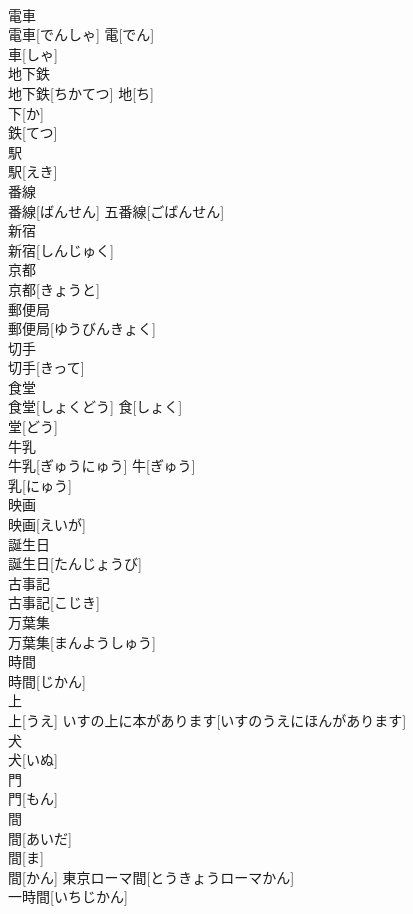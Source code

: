\documentclass[8pt]{extreport}
\begin{document}
\begin{CJK}{UTF8}{min}
\\	電車	
\\	電車[でんしゃ]	電[でん] 
\\	車[しゃ] 
\\	地下鉄	
\\	地下鉄[ちかてつ]	地[ち] 
\\	下[か] 
\\	鉄[てつ] 
\\	駅	
\\	駅[えき]	
\\	番線	
\\	番線[ばんせん]	五番線[ごばんせん] 
\\	新宿	
\\	新宿[しんじゅく]	
\\	京都	
\\	京都[きょうと]	
\\	郵便局	
\\	郵便局[ゆうびんきょく]	
\\	切手	
\\	切手[きって]	
\\	食堂	
\\	食堂[しょくどう]	食[しょく] 
\\	堂[どう] 
\\	牛乳	
\\	牛乳[ぎゅうにゅう]	牛[ぎゅう] 
\\	乳[にゅう] 
\\	映画	
\\	映画[えいが]	
\\	誕生日	
\\	誕生日[たんじょうび]	
\\	古事記	
\\	古事記[こじき]	
\\	万葉集	
\\	万葉集[まんようしゅう]	
\\	時間	
\\	時間[じかん]	
\\	上	
\\	上[うえ]	いすの上に本があります[いすのうえにほんがあります] 
\\	犬	
\\	犬[いぬ]	
\\	門	
\\	門[もん]	
\\	間	
\\	間[あいだ] 
\\	間[ま] 
\\	間[かん]	東京ローマ間[とうきょうローマかん] 
\\	一時間[いちじかん] 

\end{CJK}
\end{document}
